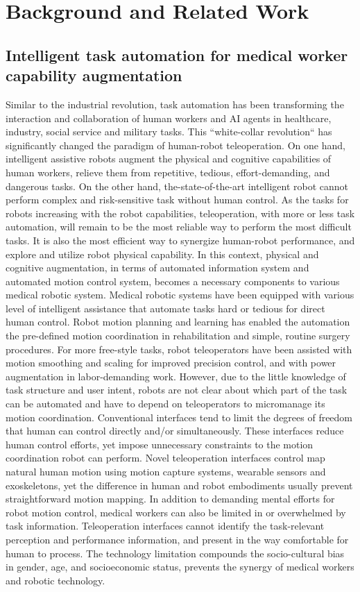 \section{Background and Related Work}

\subsection{Intelligent task automation for medical worker capability augmentation}

Similar to the industrial revolution, task automation has been transforming the interaction and collaboration of human workers and AI agents in healthcare, industry, social service and military tasks. This ``white-collar revolution`` has significantly changed the paradigm of human-robot teleoperation. On one hand, intelligent assistive robots augment the physical and cognitive capabilities of human workers, relieve them from repetitive, tedious, effort-demanding, and dangerous tasks. On the other hand, the-state-of-the-art intelligent robot cannot perform complex and risk-sensitive task without human control. As the tasks for robots increasing with the robot capabilities, teleoperation, with more or less task automation, will remain to be the most reliable way to perform the most difficult tasks. It is also the most efficient way to synergize human-robot performance, and explore and utilize robot physical capability.
In this context, physical and cognitive augmentation, in terms of automated information system and automated motion control system,  becomes a necessary components to various medical robotic system. Medical robotic systems have been equipped with various level of intelligent assistance that automate tasks hard or tedious for direct human control. Robot motion planning and learning has enabled the automation the pre-defined motion coordination in rehabilitation and simple, routine surgery procedures.  For more free-style tasks, robot teleoperators have been assisted with motion smoothing and scaling for improved precision control, and with power augmentation in labor-demanding work. However,  due to the little knowledge of task structure and user intent, robots are not clear about which part of the task can be automated and have to depend on teleoperators to micromanage its motion coordination. Conventional interfaces tend to limit the degrees of freedom that human can control directly and/or simultaneously. These interfaces reduce human control efforts, yet impose unnecessary constraints to the motion coordination robot can perform. Novel teleoperation interfaces control map natural human motion using motion capture systems, wearable sensors and exoskeletons, yet the difference in human and robot embodiments usually prevent straightforward motion mapping.  In addition to demanding mental efforts for robot motion control, medical workers can also be limited in or overwhelmed by task information.  Teleoperation interfaces cannot identify the task-relevant perception and performance information, and present in the way comfortable for human to process. The technology limitation compounds the socio-cultural bias in gender, age, and socioeconomic status, prevents the synergy of medical workers and robotic technology.  

